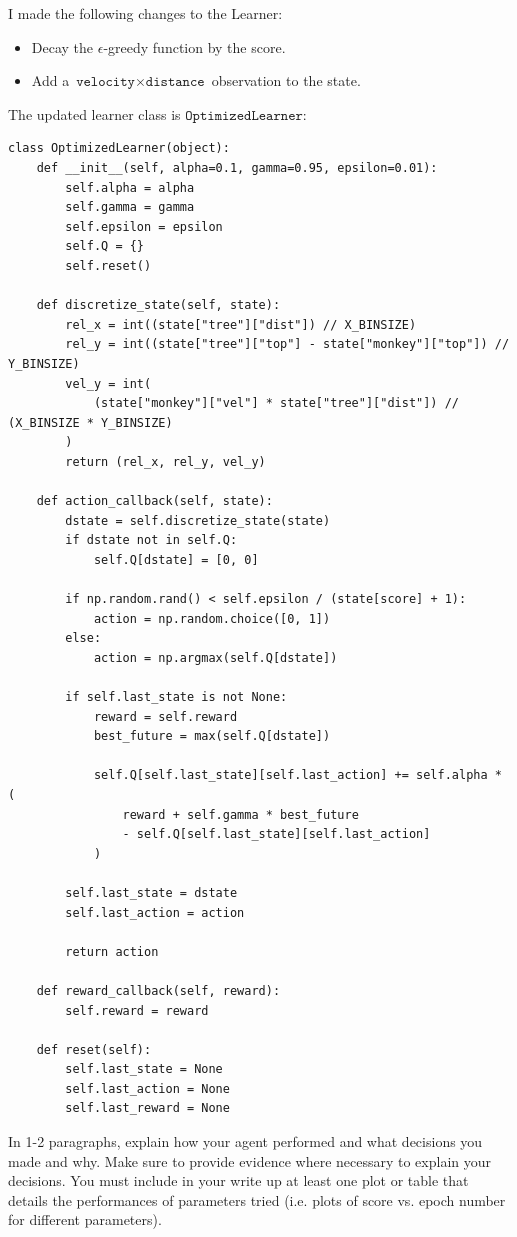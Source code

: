 \documentclass[expanded]{lkx_pset}
\begin{document}
\begin{parts}
	I made the following changes to the Learner:
	\begin{itemize}
		\item Decay the $\epsilon$-greedy function by the score.
		\item Add a $\texttt{velocity} \times \texttt{distance}$ observation to the state.
	\end{itemize}
	The updated learner class is $\texttt{OptimizedLearner}$:

	\begin{verbatim}
class OptimizedLearner(object):
    def __init__(self, alpha=0.1, gamma=0.95, epsilon=0.01):
        self.alpha = alpha
        self.gamma = gamma
        self.epsilon = epsilon
        self.Q = {}
        self.reset()

    def discretize_state(self, state):
        rel_x = int((state["tree"]["dist"]) // X_BINSIZE)
        rel_y = int((state["tree"]["top"] - state["monkey"]["top"]) // Y_BINSIZE)
        vel_y = int(
            (state["monkey"]["vel"] * state["tree"]["dist"]) // (X_BINSIZE * Y_BINSIZE)
        )
        return (rel_x, rel_y, vel_y)

    def action_callback(self, state):
        dstate = self.discretize_state(state)
        if dstate not in self.Q:
            self.Q[dstate] = [0, 0]

        if np.random.rand() < self.epsilon / (state[score] + 1):
            action = np.random.choice([0, 1])
        else:
            action = np.argmax(self.Q[dstate])

        if self.last_state is not None:
            reward = self.reward
            best_future = max(self.Q[dstate])

            self.Q[self.last_state][self.last_action] += self.alpha * (
                reward + self.gamma * best_future
                - self.Q[self.last_state][self.last_action]
            )

        self.last_state = dstate
        self.last_action = action

        return action

    def reward_callback(self, reward):
        self.reward = reward

    def reset(self):
        self.last_state = None
        self.last_action = None
        self.last_reward = None
    \end{verbatim}

	\begin{part}{}
		In 1-2 paragraphs, explain how your agent performed and what decisions you made and why. Make sure to provide evidence where necessary to explain your decisions. You must include in your write up at least one plot or table that details the performances of parameters tried (i.e. plots of score vs. epoch number for different parameters).
	\end{part}


\end{parts}
\end{document}
